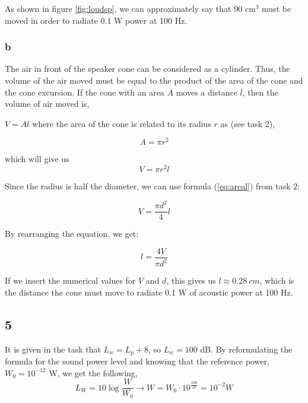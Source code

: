 \documentclass{article}
\begin{document}
As shown in figure \ref{fig:loudsp}, we can approximately say that 90 cm$^3$ must be moved in order to radiate 0.1 W power at 100 Hz.

\subsubsection*{b}

The air in front of the speaker cone can be considered as a cylinder. Thus, the volume of the air moved must be equal to the product of the area of the cone and the cone excursion. If the cone with an area $A$ moves a distance $l$, then the volume of air moved is,

$V=Al$
where the area of the cone is related to its radius $r$ as (see task 2),

\begin{equation}
    A=\pi r^2
\end{equation}

which will give us
\begin{equation}
    V=\pi r^2 l
\end{equation}

Since the radius is half the diameter, we can use formula (\ref{eq:areal}) from task 2:

\begin{equation}
    V=\frac{\pi d^2}{4}l
\end{equation}

By rearranging the equation, we get:

\begin{equation}
    l=\frac{4V}{\pi d^2}
    \label{eq:distance_speaker}
\end{equation}

If we insert the numerical values for $V$ and $d$, this gives us $l \approx 0.28 \ cm$, which is the distance the cone must move to radiate 0.1 W of acoustic power at 100 Hz. 

\subsection*{5}

It is given in the task that $L_w = L_p+8$, so $L_w = 100 $ dB. By reformulating the formula for the sound power level and knowing that the reference power, $W_0 =10^{-12}$ W, we get the following,
\begin{equation}
    L_W=10 \log{\frac{W}{W_0}} \rightarrow W=W_0 \cdot 10^{\frac{100}{10}} = 10^{-2} W
\end{equation}
\end{document}
